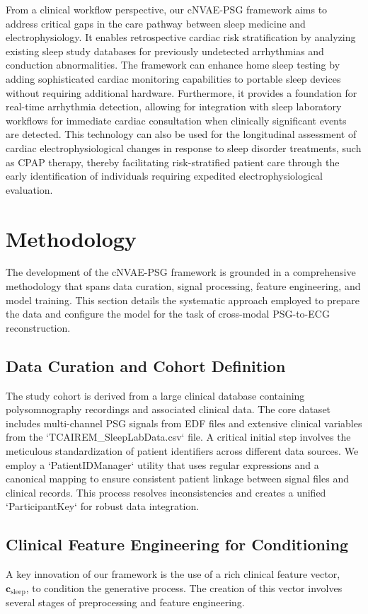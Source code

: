 \documentclass[11pt,en]{elegantpaper}
\begin{document}
From a clinical workflow perspective, our cNVAE-PSG framework aims to address critical gaps in the care pathway between sleep medicine and electrophysiology. It enables retrospective cardiac risk stratification by analyzing existing sleep study databases for previously undetected arrhythmias and conduction abnormalities. The framework can enhance home sleep testing by adding sophisticated cardiac monitoring capabilities to portable sleep devices without requiring additional hardware. Furthermore, it provides a foundation for real-time arrhythmia detection, allowing for integration with sleep laboratory workflows for immediate cardiac consultation when clinically significant events are detected. This technology can also be used for the longitudinal assessment of cardiac electrophysiological changes in response to sleep disorder treatments, such as CPAP therapy, thereby facilitating risk-stratified patient care through the early identification of individuals requiring expedited electrophysiological evaluation.

\section{Methodology}

The development of the cNVAE-PSG framework is grounded in a comprehensive methodology that spans data curation, signal processing, feature engineering, and model training. This section details the systematic approach employed to prepare the data and configure the model for the task of cross-modal PSG-to-ECG reconstruction.

\subsection{Data Curation and Cohort Definition}
The study cohort is derived from a large clinical database containing polysomnography recordings and associated clinical data. The core dataset includes multi-channel PSG signals from EDF files and extensive clinical variables from the `TCAIREM_SleepLabData.csv` file. A critical initial step involves the meticulous standardization of patient identifiers across different data sources. We employ a `PatientIDManager` utility that uses regular expressions and a canonical mapping to ensure consistent patient linkage between signal files and clinical records. This process resolves inconsistencies and creates a unified `ParticipantKey` for robust data integration.

\subsection{Clinical Feature Engineering for Conditioning}
A key innovation of our framework is the use of a rich clinical feature vector, $\mathbf{c}_{\text{sleep}}$, to condition the generative process. The creation of this vector involves several stages of preprocessing and feature engineering.
\end{document}
